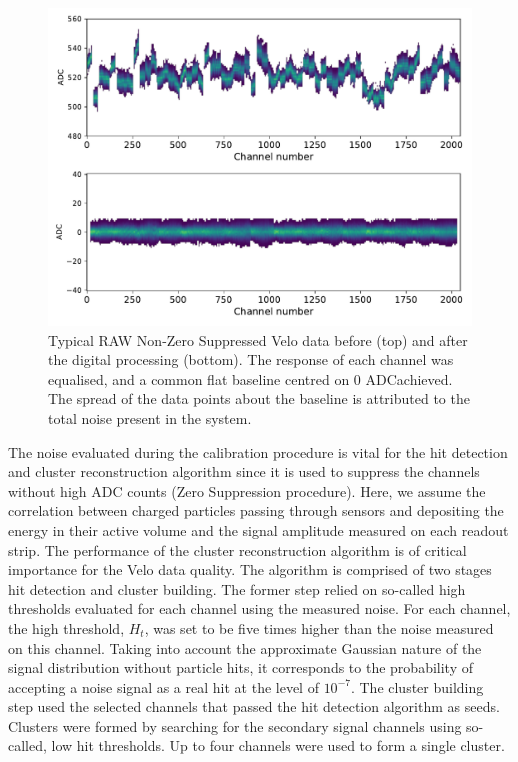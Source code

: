 \begin{figure}
    \centering
    \includegraphics[width=0.7\linewidth]{figures/chapter2/pre_post_cali.pdf}
    \caption[thing]{Typical RAW Non-Zero Suppressed Velo data before (top) and after the digital processing (bottom). The response of each channel was equalised, and a common flat baseline centred on 0 ADC\footnotemark achieved. The spread of the data points about the baseline is attributed to the total noise present in the system.}
    \label{plot:postcal}
\end{figure}


The noise evaluated during the calibration procedure is vital for the hit detection and cluster reconstruction algorithm since it is used to suppress the channels without high ADC counts (Zero Suppression procedure). Here, we assume the correlation between charged particles passing through sensors and depositing the energy in their active volume and the signal amplitude measured on each readout strip.
The performance of the cluster reconstruction  algorithm is of critical importance for the Velo data quality.
The algorithm is comprised of two stages hit detection and cluster building.
The former step relied on so-called high thresholds evaluated for each channel using the measured noise.
For each channel, the high threshold, $H_t$, was set to be five times higher than the noise measured on this channel.
Taking into account the approximate Gaussian nature of the signal distribution without particle hits, it corresponds to the probability of accepting a noise signal as a real hit at the level of $10^{-7}$.
The cluster building step used the selected channels that passed the hit detection algorithm as seeds.
Clusters were formed by searching for the secondary signal channels using so-called, low hit thresholds.
Up to four channels were used to form a single cluster.

